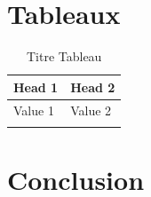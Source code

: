 \section{Tableaux}


\begin{longtable}{|m{2cm}|m{13cm}|}
        
                \hline 
                    \textbf{Head 1} & \textbf{Head 2} \\
                \hline
                \endhead
                 \endfoot
                  \endlastfoot
                \hline 
                    Value 1
                    & 
                  Value 2
                    \\
                \hline 
            \captionsetup{justification=centering,margin=2cm}
            \caption{Titre Tableau}
            \label{tab:tab1}
               
            \end{longtable}
            
\section*{Conclusion}